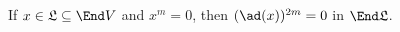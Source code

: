 If $x \in \mathfrak{L} \subseteq \End V$ and
$x^m = 0$, then $(\ad(x))^{2m} = 0$ in $\End \mathfrak{L}$.
